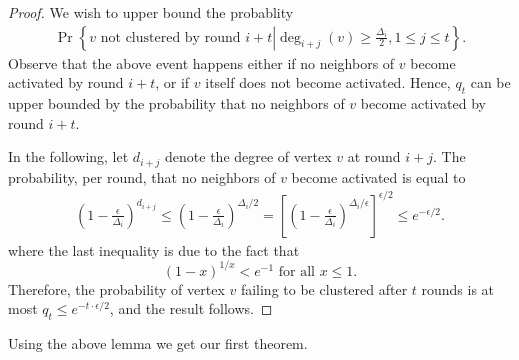 \documentclass{article} %
\begin{document}
\begin{proof}
We wish to upper bound the probablity
{\small 
\begin{align*}
\Pr\left\{\text{$v$ not clustered by round $i+t$}\left| \deg_{i+j}(v) \ge \frac{\Delta_i}{2}, 1\le j\le t \right.\right\}.
\end{align*}
}Observe that the above event happens either if no neighbors of $v$ become activated by round $i+t$, or if $v$ itself does not become activated.
Hence, $q_t$ can be upper bounded by the probability that no neighbors of $v$ become activated by round $i+t$.

In the following, let $d_{i+j}$ denote the degree of vertex $v$ at round $i+j$.
The probability, per round, that no neighbors of $v$ become activated is equal to
\begin{align*}
\left(1- \frac{\epsilon}{\Delta_i}\right)^{d_{i+j}}
\le \left(1- \frac{\epsilon}{\Delta_i}\right)^{\Delta_i/2}
= \left[\left(1- \frac{\epsilon}{\Delta_i}\right)^{\Delta_i/\epsilon}\right]^{\epsilon/2}
\le e^{-\epsilon/2}.
\end{align*}
where the last inequality is due to the fact that 
$$(1-x)^{1/x}<e^{-1}\text{ for all }x\le 1.$$
Therefore, the probability of vertex $v$ failing to be clustered after $t$ rounds is at most
$q_t\le e^{-t\cdot \epsilon /2}$,
and the result follows.
\end{proof}


Using the above lemma we get our first theorem.
\end{document}
